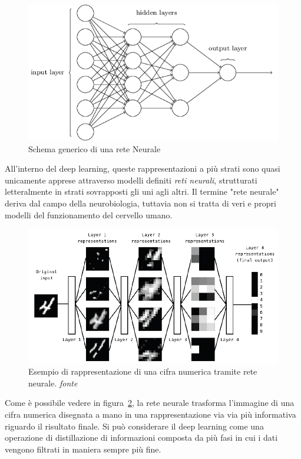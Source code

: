 \begin{figure}[!bp]
	\centering
	\includegraphics[width=\columnwidth]{figures/mlp-network.png}
	\caption{Schema generico di una rete Neurale \label{nn}}
\end{figure} 
 
All'interno del deep learning, queste rappresentazioni a più strati sono quasi unicamente apprese attraverso modelli definiti \textit{reti neurali}, strutturati letteralmente in strati sovrapposti gli uni agli altri. Il termine "rete neurale" deriva dal campo della neurobiologia, tuttavia non si tratta di veri e propri modelli del funzionamento del cervello umano.

\begin{figure}[!bp]
	\centering
	\includegraphics[width=\columnwidth]{figures/deeplearning.png}
	\caption{Esempio di rappresentazione di una cifra numerica tramite rete neurale. \textit{fonte}%
	~\cite{chollet2017deep} \label{fig:neuralnetwork} }
\end{figure}

Come è possibile vedere in figura~\ref{fig:neuralnetwork}, la rete neurale trasforma l'immagine di una cifra numerica disegnata a mano in una rappresentazione via via più informativa riguardo il risultato finale. Si può considerare il deep learning come una operazione di distillazione di informazioni composta da più fasi in cui i dati vengono filtrati in maniera sempre più fine.

